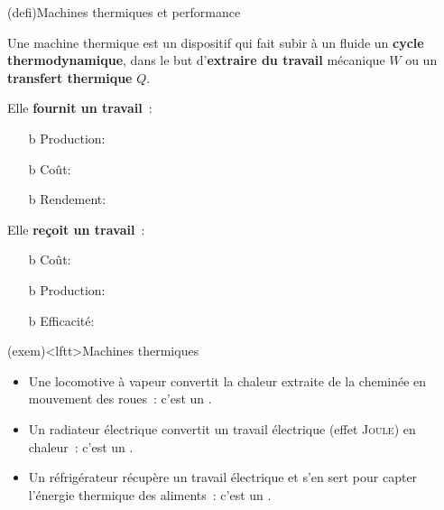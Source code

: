 \documentclass[../../main/main.tex]{subfiles}
\begin{document}
\begin{tcb*}(defi){Machines thermiques et performance}
	\begin{isd}[righthand ratio=.25]
		Une machine thermique est un dispositif qui fait subir à un fluide un
		\textbf{cycle thermodynamique}, dans le but d'\textbf{extraire du travail}
		mécanique $W$ ou un \textbf{transfert thermique} $Q$.
		\tcblower
		\vspace{-15pt}
		\psw{%
			\[
				\text{COP} = \abs{\frac{\text{production}}{\text{coût}}}
			\]
		}%
		\vspace{-15pt}
	\end{isd}
	\begin{isd}[sidebyside align=top]
		Elle \textbf{fournit un travail}~:
		\begin{itemize}
			\item[b]{Production}: 
			\item[b]{Coût}: 
			\item[b]{Rendement}: 
		\end{itemize}
		\vspace{-15pt}
		\tcblower
		Elle \textbf{reçoit un travail}~:
		\begin{itemize}
			\item[b]{Coût}: 
			\item[b]{Production}: 
			\item[b]{Efficacité}: 
		\end{itemize}
		\vspace{-15pt}
	\end{isd}
\end{tcb*}
\vspace{-15pt}
\begin{tcb}(exem)<lftt>{Machines thermiques}
	\begin{itemize}
		\item Une locomotive à vapeur convertit la chaleur extraite de la cheminée
		      en mouvement des roues~: c'est un .
		\item Un radiateur électrique convertit un travail électrique (effet
		      \textsc{Joule}) en chaleur~: c'est un .
		\item Un réfrigérateur récupère un travail électrique et s'en sert pour
		      capter l'énergie thermique des aliments~: c'est un
		      .
	\end{itemize}
\end{tcb}
\end{document}
